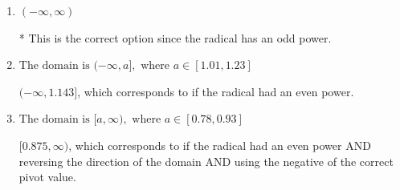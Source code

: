 \documentclass{extbook}[14pt]
\begin{document}
\begin{enumerate}
{\begin{enumerate}[label=\Alph*.]
$[1.143, \infty)$, which corresponds to if the radical had an even power AND reversing the direction of the domain.
\item \( (-\infty, \infty) \)

* This is the correct option since the radical has an odd power.
\item \( \text{The domain is } (-\infty, a], \text{   where } a \in [1.01, 1.23] \)

$(-\infty, 1.143]$, which corresponds to if the radical had an even power.
\item \( \text{The domain is } [a, \infty), \text{   where } a \in [0.78, 0.93] \)

$[0.875, \infty)$, which corresponds to if the radical had an even power AND reversing the direction of the domain AND using the negative of the correct pivot value.
\end{enumerate}

}
\end{enumerate}
\end{document}
